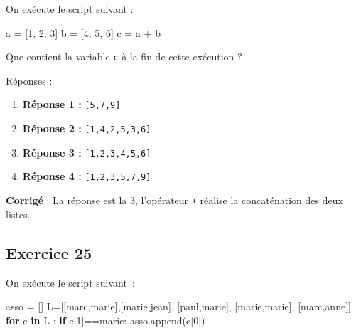 \documentclass[11pt]{article}
\newenvironment{Shaded}{}{}
\newcommand{\KeywordTok}[1]{\textcolor[rgb]{0.00,0.44,0.13}{\textbf{{#1}}}}
\newcommand{\DecValTok}[1]{\textcolor[rgb]{0.25,0.63,0.44}{{#1}}}
\newcommand{\StringTok}[1]{\textcolor[rgb]{0.25,0.44,0.63}{{#1}}}
\newcommand{\NormalTok}[1]{{#1}}
\newcommand{\ControlFlowTok}[1]{\textcolor[rgb]{0.00,0.44,0.13}{\textbf{{#1}}}}
\newcommand{\OperatorTok}[1]{\textcolor[rgb]{0.40,0.40,0.40}{{#1}}}
\begin{document}
On exécute le script suivant :

\begin{Shaded}
\begin{Highlighting}[]
\NormalTok{a }\OperatorTok{=}\NormalTok{ [}\DecValTok{1}\NormalTok{, }\DecValTok{2}\NormalTok{, }\DecValTok{3}\NormalTok{]}
\NormalTok{b }\OperatorTok{=}\NormalTok{ [}\DecValTok{4}\NormalTok{, }\DecValTok{5}\NormalTok{, }\DecValTok{6}\NormalTok{]}
\NormalTok{c }\OperatorTok{=}\NormalTok{ a }\OperatorTok{+}\NormalTok{ b}
\end{Highlighting}
\end{Shaded}

Que contient la variable \texttt{c} à la fin de cette exécution ?

Réponses :

\begin{enumerate}
\def\labelenumi{\arabic{enumi}.}
\item
  \textbf{Réponse 1 :} \texttt{{[}5,7,9{]}}
\item
  \textbf{Réponse 2 :} \texttt{{[}1,4,2,5,3,6{]}}
\item
  \textbf{Réponse 3 :} \texttt{{[}1,2,3,4,5,6{]}}
\item
  \textbf{Réponse 4 :} \texttt{{[}1,2,3,5,7,9{]}}
\end{enumerate}

    \textbf{Corrigé} : La réponse est la 3, l'opérateur \texttt{+} réalise
la concaténation des deux listes.

    \hypertarget{exercice-25}{%
\subsection{Exercice 25}\label{exercice-25}}

On exécute le script suivant~:

\begin{Shaded}
\begin{Highlighting}[]
\NormalTok{asso }\OperatorTok{=}\NormalTok{ []}
\NormalTok{L}\OperatorTok{=}\NormalTok{[[}\StringTok{\textquotesingle{}marc\textquotesingle{}}\NormalTok{,}\StringTok{\textquotesingle{}marie\textquotesingle{}}\NormalTok{],[}\StringTok{\textquotesingle{}marie\textquotesingle{}}\NormalTok{,}\StringTok{\textquotesingle{}jean\textquotesingle{}}\NormalTok{],}
\NormalTok{    [}\StringTok{\textquotesingle{}paul\textquotesingle{}}\NormalTok{,}\StringTok{\textquotesingle{}marie\textquotesingle{}}\NormalTok{], [}\StringTok{\textquotesingle{}marie\textquotesingle{}}\NormalTok{,}\StringTok{\textquotesingle{}marie\textquotesingle{}}\NormalTok{],}
\NormalTok{    [}\StringTok{\textquotesingle{}marc\textquotesingle{}}\NormalTok{,}\StringTok{\textquotesingle{}anne\textquotesingle{}}\NormalTok{]]}
\ControlFlowTok{for}\NormalTok{ c }\KeywordTok{in}\NormalTok{ L :}
    \ControlFlowTok{if}\NormalTok{ c[}\DecValTok{1}\NormalTok{]}\OperatorTok{==}\StringTok{\textquotesingle{}marie\textquotesingle{}}\NormalTok{:}
\NormalTok{        asso.append(c[}\DecValTok{0}\NormalTok{])}
\end{Highlighting}
\end{Shaded}
\end{document}
